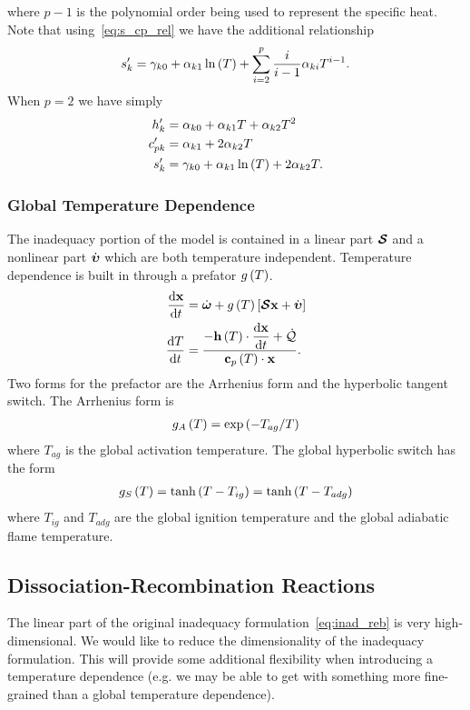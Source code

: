 where $p-1$ is the polynomial order being used to represent the specific heat.  Note that 
using~\eqref{eq:s_cp_rel} we have the additional relationship 
\begin{align}
  s_{k}^{\prime} = \gamma_{k0} + \alpha_{k1}\ln\left(T\right) + \sum_{i=2}^{p}{\frac{i}{i-1}\alpha_{ki}T^{i-1}}.
\end{align}
When $p=2$ we have simply 
\begin{align}
  h_{k}^{\prime}  &= \alpha_{k0} + \alpha_{k1}T + \alpha_{k2}T^{2} \\ 
  c_{pk}^{\prime} &= \alpha_{k1} + 2\alpha_{k2}T \\
  s_{k}^{\prime}  &= \gamma_{k0}  + \alpha_{k1}\ln\left(T\right) + 2\alpha_{k2}T.
\end{align}



\subsubsection{Global Temperature Dependence}
The inadequacy portion of the model is contained in a linear part $\boldsymbol{\mathcal{S}}$ and a nonlinear part 
$\dot{\boldsymbol{\upsilon}}$ which are both temperature independent.  Temperature dependence is built in through 
a prefator $g\left(T\right)$.  
\begin{align}
  \frac{\mathrm{d} \mathbf{x}}{\mathrm{d} t} &= \dot{\boldsymbol{\omega}} + g\left(T\right)\left[\boldsymbol{\mathcal{S}} \mathbf{x} + \dot{\boldsymbol{\upsilon}}\right] \\
  \frac{\mathrm{d} T}{\mathrm{d} t}  &= \frac{-\displaystyle \mathbf{h}\left(T\right)\cdot\frac{\mathrm{d} \mathbf{x}}{\mathrm{d} t} + \dot{\mathcal{Q}}}{\displaystyle \mathbf{c}_{p}\left(T\right)\cdot\mathbf{x}}.
\end{align}
Two forms for the prefactor are the Arrhenius form and the hyperbolic tangent switch. 
The Arrhenius form is
\begin{align}
  g_{A}\left(T\right) = \exp\left(-T_{ag} / T\right)
\end{align}
where $T_{ag}$ is the global activation temperature.  The global hyperbolic switch has 
the form
\begin{align}
  g_{S}\left(T\right) = \tanh\left(T-T_{ig}\right) = \tanh\left(T - T_{adg}\right)
\end{align}
where $T_{ig}$ and $T_{adg}$ are the global ignition temperature and the global 
adiabatic flame temperature.

\subsection{Dissociation-Recombination Reactions}
The linear part of the original inadequacy formulation~\ref{eq:inad_reb} is very 
high-dimensional.  We would like to reduce the dimensionality of the inadequacy 
formulation.  This will provide some additional flexibility when introducing a 
temperature dependence (e.g. we may be able to get with something more fine-grained 
than a global temperature dependence).

